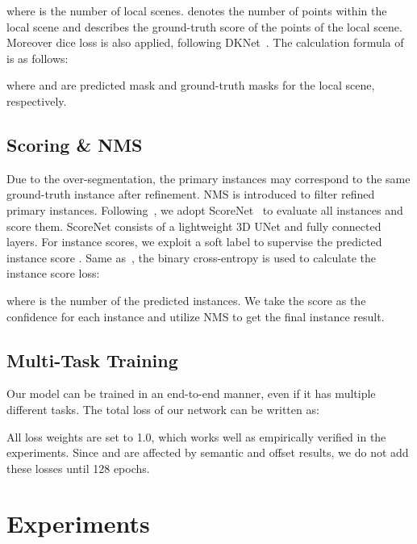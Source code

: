 \documentclass[10pt,twocolumn,letterpaper]{article}
\begin{document}
where  is the number of local scenes.  denotes the number of points within the  local scene and  describes the ground-truth score of the  points of the  local scene. Moreover dice loss  is also applied, following DKNet~\cite{wu2022dknet}. The calculation formula of  is as follows:

where  and  are predicted mask and ground-truth masks for the  local scene, respectively.



\subsection{Scoring \& NMS}
Due to the over-segmentation, the primary instances may correspond to the same ground-truth instance after refinement. NMS is introduced to filter refined primary instances. Following~\cite{chen2021hierarchical}, we adopt ScoreNet~\cite{huang2019mask,jiang2018acquisition,li2019gs3d} to evaluate all instances and score them. ScoreNet consists of a lightweight 3D UNet and fully connected layers. For instance scores, we exploit a soft label  to supervise the predicted instance score . Same as~\cite{jiang2020pointgroup}, the binary cross-entropy is used to calculate the instance score loss:


where  is the number of the predicted instances. We take the score as the confidence for each instance and utilize NMS to get the final instance result.

\subsection{Multi-Task Training}
\label{RE_2_6}
Our model can be trained in an end-to-end manner, even if it has multiple different tasks. The total loss of our network can be written as:


All loss weights are set to 1.0, which works well as empirically  verified in the experiments. Since  and  are affected by semantic and offset results, we do not add these losses until 128 epochs.


\section{Experiments}
\end{document}
